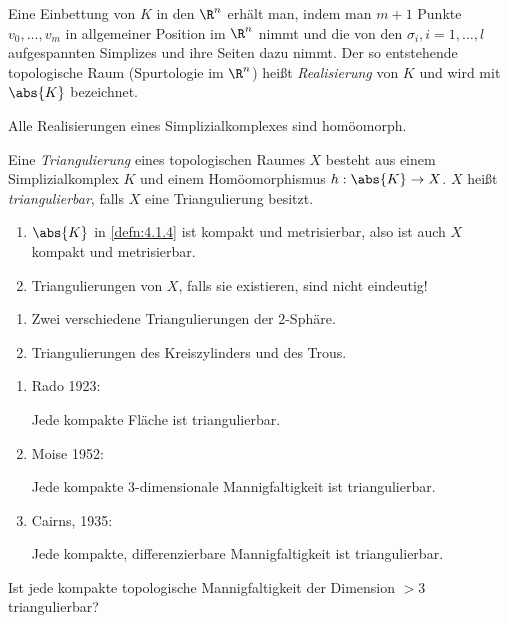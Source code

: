 Eine Einbettung von $K$ in den $\R^n$ erhält man, indem man $m+1$ Punkte
$v_0,\ldots,v_m$ in allgemeiner Position im $\R^n$ nimmt und die von den
$\sigma_i, i=1,\ldots,l$ aufgespannten Simplizes und ihre Seiten dazu nimmt.
Der so entstehende topologische Raum (Spurtologie im $\R^n$) heißt
\emph{Realisierung} von $K$ und wird mit $\abs{K}$ bezeichnet.

Alle Realisierungen eines Simplizialkomplexes sind homöomorph.

\begin{defn}
\label{defn:4.1.4}
Eine \emph{Triangulierung} eines topologischen Raumes $X$ besteht aus einem
Simplizialkomplex $K$ und einem Homöomorphismus $h: \abs{K}\to X$. $X$ heißt
\emph{triangulierbar}, falls $X$ eine Triangulierung besitzt.\fishhere
\end{defn}
\begin{bemn}[Beachte:]
\begin{enumerate}[label=\arabic{*}.)]
  \item $\abs{K}$ in \ref{defn:4.1.4} ist kompakt und metrisierbar, also ist
  auch $X$ kompakt und metrisierbar.
  \item Triangulierungen von $X$, falls sie existieren, sind nicht eindeutig!
\end{enumerate}
\end{bemn}

\begin{bspn}
\begin{enumerate}[label=\arabic{*}.)]
  \item Zwei verschiedene Triangulierungen der $2$-Sphäre.
\item Triangulierungen des Kreiszylinders und des Trous.\bsphere
\end{enumerate}
\end{bspn}

\begin{propn}[Sätze]
\begin{enumerate}[label=\arabic{*}.)]
  \item Rado 1923:

Jede kompakte Fläche ist triangulierbar.
\item Moise 1952:

Jede kompakte $3$-dimensionale Mannigfaltigkeit ist triangulierbar.
\item Cairns, 1935:

Jede kompakte, differenzierbare Mannigfaltigkeit ist triangulierbar.\fishhere
\end{enumerate}
\end{propn}
\begin{propn}
Ist jede kompakte topologische Mannigfaltigkeit der Dimension $>3$
triangulierbar?\fishhere
\end{propn}

